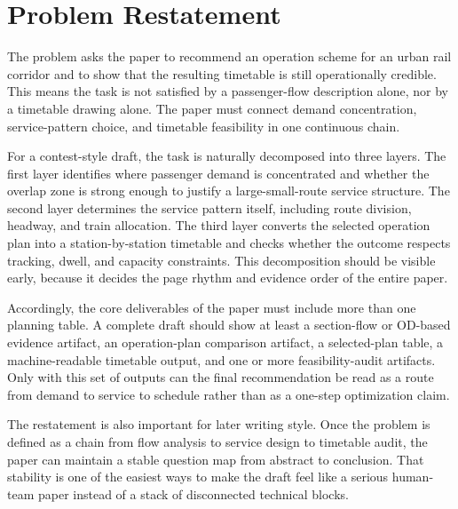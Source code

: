 \section{Problem Restatement}

The problem asks the paper to recommend an operation scheme for an urban rail corridor and to show that the resulting timetable is still operationally credible. This means the task is not satisfied by a passenger-flow description alone, nor by a timetable drawing alone. The paper must connect demand concentration, service-pattern choice, and timetable feasibility in one continuous chain.

For a contest-style draft, the task is naturally decomposed into three layers. The first layer identifies where passenger demand is concentrated and whether the overlap zone is strong enough to justify a large-small-route service structure. The second layer determines the service pattern itself, including route division, headway, and train allocation. The third layer converts the selected operation plan into a station-by-station timetable and checks whether the outcome respects tracking, dwell, and capacity constraints. This decomposition should be visible early, because it decides the page rhythm and evidence order of the entire paper.

Accordingly, the core deliverables of the paper must include more than one planning table. A complete draft should show at least a section-flow or OD-based evidence artifact, an operation-plan comparison artifact, a selected-plan table, a machine-readable timetable output, and one or more feasibility-audit artifacts. Only with this set of outputs can the final recommendation be read as a route from demand to service to schedule rather than as a one-step optimization claim.

The restatement is also important for later writing style. Once the problem is defined as a chain from flow analysis to service design to timetable audit, the paper can maintain a stable question map from abstract to conclusion. That stability is one of the easiest ways to make the draft feel like a serious human-team paper instead of a stack of disconnected technical blocks.
